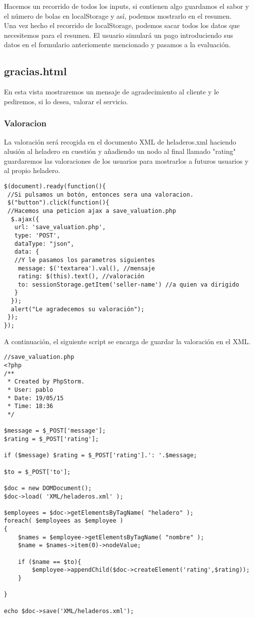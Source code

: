 \documentclass[11pt,a4paper]{article}
\begin{document}
Hacemos un recorrido de todos los inputs, si contienen algo guardamos el sabor y el número de bolas en localStorage y así, podemos mostrarlo en el resumen.\\

Una vez hecho el recorrido de localStorage, podemos sacar todos los datos que necesitemos para el resumen. El usuario simulará un pago introduciendo sus datos en el formulario anteriomente mencionado y pasamos a la evaluación.\\

\subsection{gracias.html}

En esta vista mostraremos un mensaje de agradecimiento al cliente y le pediremos, si lo desea, valorar el servicio.\\

\subsubsection{Valoracion}
La valoración será recogida en el documento XML de heladeros.xml haciendo alusión al heladero en cuestión y añadiendo un nodo al final llamado "rating" guardaremos las valoraciones de los usuarios para mostrarlos a futuros usuarios y al propio heladero.

\begin{lstlisting}
$(document).ready(function(){
 //Si pulsamos un botón, entonces sera una valoracion.
 $("button").click(function(){
 //Hacemos una peticion ajax a save_valuation.php
  $.ajax({
   url: 'save_valuation.php',
   type: 'POST',
   dataType: "json",
   data: {
   //Y le pasamos los parametros siguientes
    message: $('textarea').val(), //mensaje
    rating: $(this).text(), //valoración
    to: sessionStorage.getItem('seller-name') //a quien va dirigido
   }
  });
  alert("Le agradecemos su valoración");
 });
});
\end{lstlisting}

A continuación, el siguiente script se encarga de guardar la valoración en el XML.
\begin{lstlisting}
//save_valuation.php
<?php
/**
 * Created by PhpStorm.
 * User: pablo
 * Date: 19/05/15
 * Time: 18:36
 */

$message = $_POST['message'];
$rating = $_POST['rating'];

if ($message) $rating = $_POST['rating'].': '.$message;

$to = $_POST['to'];

$doc = new DOMDocument();
$doc->load( 'XML/heladeros.xml' );

$employees = $doc->getElementsByTagName( "heladero" );
foreach( $employees as $employee )
{
    $names = $employee->getElementsByTagName( "nombre" );
    $name = $names->item(0)->nodeValue;

    if ($name == $to){
        $employee->appendChild($doc->createElement('rating',$rating));
    }

}

echo $doc->save('XML/heladeros.xml');
\end{lstlisting}
\end{document}
